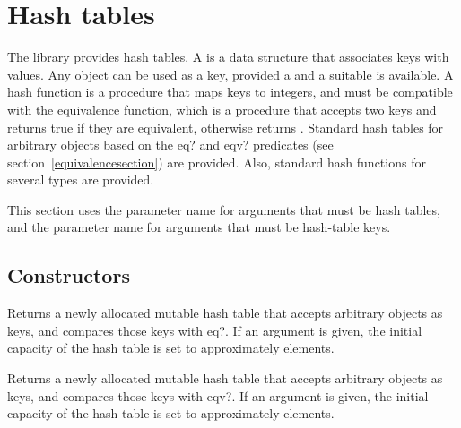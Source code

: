 \chapter{Hash tables}
\label{hashtablechapter}

The  library provides hash tables.
A  is a data structure that associates keys with values.
Any object can be used as a key, provided a 
and a suitable  is available.  A hash function is a
procedure that maps
keys to integers, and must be compatible with the equivalence function,
which is a procedure that accepts two keys and returns true if they
are equivalent, otherwise returns \schfalse{}.
Standard hash tables for arbitrary objects based on the {\cf eq?} and 
{\cf eqv?} predicates (see section~\ref{equivalencesection}) are provided.  
Also, standard hash functions for several types are provided.

This section uses the  parameter name for arguments
that must be hash tables, and the  parameter name for
arguments that must be hash-table keys.

\section{Constructors}


\begin{entry}{%
}

Returns a newly allocated mutable hash table that accepts
arbitrary objects as keys,
and compares those keys with {\cf eq?}. If an argument is given, the initial 
capacity of the hash table is set to approximately  elements.

\end{entry}

\begin{entry}{%
}

Returns a newly allocated mutable hash table that accepts
arbitrary objects as keys,
and compares those keys with {\cf eqv?}.
If an argument is given, the initial 
capacity of the hash table is set to approximately  elements.

\end{entry}

